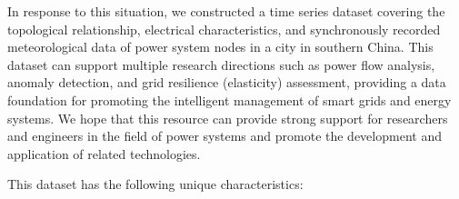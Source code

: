 \documentclass[12pt]{article}
\begin{document}
In response to this situation, we constructed a time series dataset covering the topological relationship,
electrical characteristics, and synchronously recorded meteorological data of power system nodes in a city in southern China.
This dataset can support multiple research directions such as power flow analysis, anomaly detection, 
and grid resilience (elasticity) assessment, providing a data foundation for promoting the intelligent management of
smart grids and energy systems. We hope that this resource can provide strong support for researchers and engineers in the field 
of power systems and promote the development and application of related technologies.



This dataset has the following unique characteristics:

\end{document}
